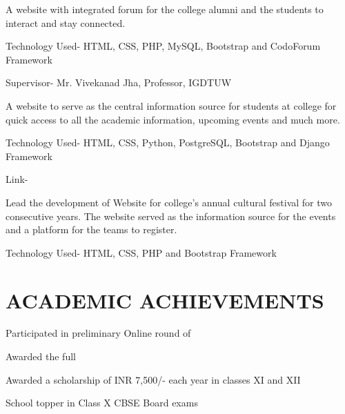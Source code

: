 \documentclass[]{resume-openfont}
\begin{document}
\begin{minipage}[t]{0.66\textwidth}
A website with integrated forum for the college alumni and the students to interact and stay connected.
\begin{tightemize}
\item Technology Used- HTML, CSS, PHP, MySQL, Bootstrap and CodoForum Framework
\item Supervisor- Mr. Vivekanad Jha, Professor, IGDTUW
\end{tightemize}
\sectionsep

A website to serve as the central information source for students at college for quick access to all the academic information, upcoming events and much more.
\begin{tightemize}
\item Technology Used- HTML, CSS, Python, PostgreSQL, Bootstrap and Django
Framework
\item Link- \href{http://igdtuwonline.herokuapp.com/}{}
\end{tightemize}
\sectionsep

Lead the development of Website for college’s annual cultural festival for two consecutive years. The website served as the information source for the events and a platform for the teams to register. 
\begin{tightemize}
\item Technology Used- HTML, CSS, PHP and Bootstrap Framework
\end{tightemize}

\sectionsep


\section{ACADEMIC ACHIEVEMENTS}

\sectionsep
\sectionsep

\begin{tightemize}
\item {}
\item {}
\item Participated in preliminary Online round of 
\item Awarded the full 
\item Awarded a scholarship of INR 7,500/-  each year in classes XI and XII
\item School topper in Class X CBSE Board exams
\end{tightemize}
\sectionsep


\end{minipage}
\end{document}
